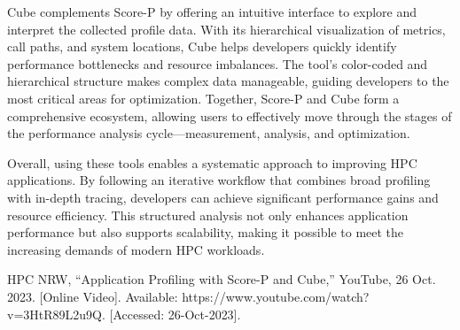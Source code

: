 \documentclass[conference]{IEEEtran}
\begin{document}
Cube complements Score-P by offering an intuitive interface to explore and interpret the collected profile data. With its hierarchical visualization of metrics, call paths, and system locations, Cube helps developers quickly identify performance bottlenecks and resource imbalances. The tool’s color-coded and hierarchical structure makes complex data manageable, guiding developers to the most critical areas for optimization. Together, Score-P and Cube form a comprehensive ecosystem, allowing users to effectively move through the stages of the performance analysis cycle—measurement, analysis, and optimization.

Overall, using these tools enables a systematic approach to improving HPC applications. By following an iterative workflow that combines broad profiling with in-depth tracing, developers can achieve significant performance gains and resource efficiency. This structured analysis not only enhances application performance but also supports scalability, making it possible to meet the increasing demands of modern HPC workloads.


\begin{thebibliography}{00}
 HPC NRW, ``Application Profiling with Score-P and Cube,'' 
YouTube, 26 Oct. 2023. [Online Video]. 
Available: https://www.youtube.com/watch?v=3HtR89L2u9Q.
[Accessed: 26-Oct-2023].
\end{thebibliography}
\end{document}
